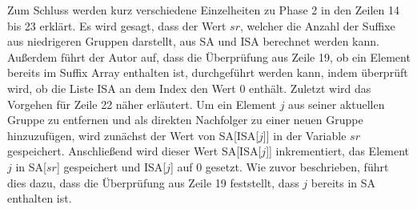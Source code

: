 Zum Schluss werden kurz verschiedene Einzelheiten zu Phase 2 in den Zeilen 14 bis 23 erklärt. 
Es wird gesagt, dass der Wert $sr$, welcher die Anzahl der Suffixe aus niedrigeren Gruppen darstellt, aus SA und ISA berechnet werden kann. 
Außerdem führt der Autor auf, dass die Überprüfung aus Zeile 19, ob ein Element bereits im Suffix Array enthalten ist, durchgeführt werden kann, indem überprüft wird, ob die Liste ISA an dem Index den Wert 0 enthält. 
Zuletzt wird das Vorgehen für Zeile 22 näher erläutert. 
Um ein Element $j$ aus seiner aktuellen Gruppe zu entfernen und als direkten Nachfolger zu einer neuen Gruppe hinzuzufügen, wird zunächst der Wert von SA[ISA[$j$]] in der Variable $sr$ gespeichert. 
Anschließend wird dieser Wert SA[ISA[$j$]] inkrementiert, das Element $j$ in SA[$sr$] gespeichert und ISA[$j$] auf 0 gesetzt. 
Wie zuvor beschrieben, führt dies dazu, dass die Überprüfung aus Zeile 19 feststellt, dass $j$ bereits in SA enthalten ist.
